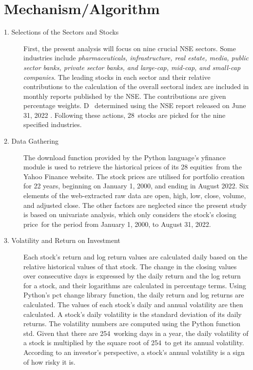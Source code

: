 \section{Mechanism/Algorithm}
\begin{description}
   \item[1. Selections of the Sectors and Stocks] First, the present analysis will focus on nine crucial NSE sectors. Some industries include \emph{pharmaceuticals, infrastructure, real estate, media, public sector banks, private sector banks, and large-cap, mid-cap, and small-cap companies}. The leading stocks in each sector and their relative contributions to the calculation of the overall sectoral index are included in monthly reports published by the NSE.
The contributions are given percentage weights. D  determined using the NSE report released on June 31, 2022 \cite{NSEJune2022}. Following these actions, 28 stocks are picked for the nine specified industries.
   \item[2. Data Gathering] The download function provided by the Python language's yfinance module is used to retrieve the historical prices of its 28 equities from the Yahoo Finance website. The stock prices are utilised for portfolio creation for 22 years, beginning on January 1, 2000, and ending in August 2022. Six elements of the web-extracted raw data are open, high, low, close, volume, and adjusted close. The other factors are neglected since the present study is based on univariate analysis, which only considers the stock's closing price for the period from January 1, 2000, to August 31, 2022.
   \item[3. Volatility and Return on Investment] Each stock's return and log return values are calculated daily based on the relative historical values of that stock. The change in the closing values over consecutive days is expressed by the daily return and the log return for a stock, and their logarithms are calculated in percentage terms. Using Python's pct change library function, the daily return and log returns are calculated. The values of each stock's daily and annual volatility are then calculated. A stock's daily volatility is the standard deviation of its daily returns. The volatility numbers are computed using the Python function std. Given that there are 254 working days in a year, the daily volatility of a stock is multiplied by the square root of 254 to get its annual volatility. According to an investor's perspective, a stock's annual volatility is a sign of how risky it is.

\end{description}
